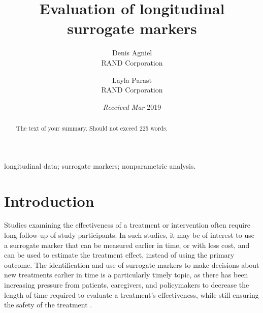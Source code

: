 \documentclass[useAMS,usenatbib,referee]{biom}
\title[]{Evaluation of longitudinal surrogate markers}
\author{ Denis Agniel \email{\href{mailto:dagniel@rand.org}{\nolinkurl{dagniel@rand.org}}} \\ RAND Corporation  \and
		 Layla Parast \email{\href{mailto:parast@rand.org}{\nolinkurl{parast@rand.org}}} \\ RAND Corporation 
	   }
\begin{document}
\date{{\it Received Mar} 2019}

\pagerange{\pageref{firstpage}--\pageref{lastpage}} 



\label{firstpage}


\begin{abstract}
The text of your summary. Should not exceed 225 words.
\end{abstract}

%
%

\begin{keywords}
longitudinal data; surrogate markers; nonparametric analysis.
\end{keywords}

\maketitle

  \def\sone{^{(1)}} \def\szero{^{(0)}}
\def\lin{^{(\text{lin})}}
\def\gam{^{(\text{gam})}}
\def\k{^{(\text{kern})}}
\def\subxo{_{\bX\sone}}
\def\subxz{_{\bX\szero}}
\def\mhalf{^{-\frac{1}{2}}}
\def\sumjp{\sum_{j=1}^p}

\section{Introduction}\label{intro}
Studies examining the effectiveness of a treatment or intervention often require long follow-up of study participants. In such studies, it may be of interest to use a surrogate marker that can be measured earlier in time, or with less cost, and can be used to estimate the treatment effect, instead of using the primary outcome. The identification and use of surrogate markers to make decisions about new treatments earlier in time is a particularly timely topic, as there has been increasing pressure from patients, caregivers, and policymakers to decrease the length of time required to evaluate a treatment's effectiveness, while still ensuring the safety of the treatment \citep{cleary2018contribution,stat}. 
\end{document}
